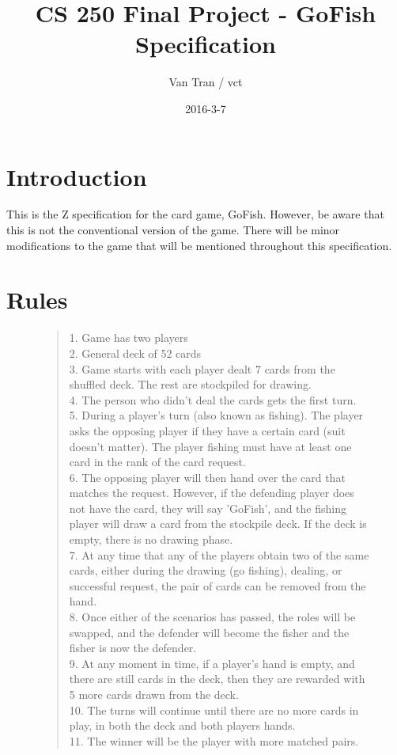 \documentclass{article}
\title{CS 250 Final Project - GoFish Specification}
\author{Van Tran / vct}
\date{2016-3-7}
\begin{document}
\maketitle

\section*{Introduction}
This is the Z specification for the card game, GoFish.
However, be aware that this is not the conventional version
of the game. There will be minor modifications to the game
that will be mentioned throughout this specification.

\section*{Rules}
\begin{figure}[h]
\begin{quotation}
1. Game has two players \\
2. General deck of 52 cards \\
3. Game starts with each player dealt 7 cards from the
shuffled deck. The rest are stockpiled for drawing. \\
4. The person who didn't deal the cards gets the first turn. \\
5. During a player's turn (also known as fishing). The player
asks the opposing player if they have a certain card (suit doesn't matter).
The player fishing must have at least one card in the rank of the card request. \\
6. The opposing player will then hand over the card that matches
the request. However, if the defending player does not have the card,
they will say 'GoFish', and the fishing player will draw a card
from the stockpile deck. If the deck is empty, there is no drawing phase. \\
7. At any time that any of the players obtain two of the same cards,
either during the drawing (go fishing), dealing, or successful request,
the pair of cards can be removed from the hand. \\
8. Once either of the scenarios has passed, the roles will be swapped,
and the defender will become the fisher and the fisher is now the defender. \\
9. At any moment in time, if a player's hand is empty, and there are still
cards in the deck, then they are rewarded with 5 more cards drawn from the deck. \\
10. The turns will continue until there are no more cards in play, in both
the deck and both players hands. \\
11. The winner will be the player with more matched pairs. \\
\end{quotation}
\end{figure}
\end{document}
